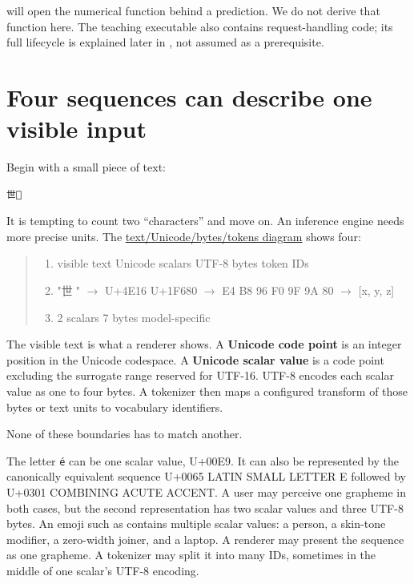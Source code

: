  will open the numerical function behind a prediction.
We do not derive that function here. The teaching executable also contains
request-handling code; its full lifecycle is explained later in
, not assumed as a prerequisite.

\section{Four sequences can describe one visible
input}\label{four-sequences-can-describe-one-visible-input}

Begin with a small piece of text:

\begin{verbatim}
世🚀
\end{verbatim}

It is tempting to count two ``characters'' and move on. An inference
engine needs more precise units. The
\href{https://github.com/hermonai/inside-the-llm-engine/blob/astra-visual-rewrite/diagrams/tokenizer/text-unicode-bytes-tokens.txt}{text/Unicode/bytes/tokens
diagram} shows four:

\begin{quote}
\begin{enumerate}
\item visible text       Unicode scalars       UTF-8 bytes           token IDs
\item "世🚀"          \(\longrightarrow\)   U+4E16 U+1F680    \(\longrightarrow\)   E4 B8 96 F0 9F 9A 80  \(\longrightarrow\)  [x, y, z]
\item 2 scalars                7 bytes            model-specific
\end{enumerate}
\end{quote}

The visible text is what a renderer shows. A \textbf{Unicode code point}
is an integer position in the Unicode codespace. A \textbf{Unicode
scalar value} is a code point excluding the surrogate range reserved for
UTF-16. UTF-8 encodes each scalar value as one to four bytes. A
tokenizer then maps a configured transform of those bytes or text units
to vocabulary identifiers.

None of these boundaries has to match another.

The letter \texttt{é} can be one scalar value, U+00E9. It can also be
represented by the canonically equivalent sequence U+0065 LATIN SMALL
LETTER E followed by U+0301 COMBINING ACUTE ACCENT. A user may perceive
one grapheme in both cases, but the second representation has two scalar
values and three UTF-8 bytes. An emoji such as
 contains multiple scalar values: a
person, a skin-tone modifier, a zero-width joiner, and a laptop. A
renderer may present the sequence as one grapheme. A tokenizer may split
it into many IDs, sometimes in the middle of one scalar's UTF-8
encoding.

